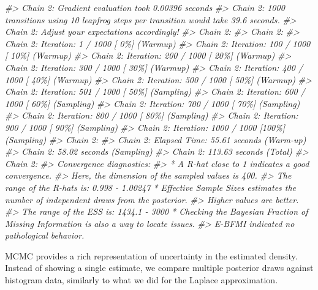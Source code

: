 \documentclass[
]{article}
\newenvironment{Shaded}{\begin{snugshade}}{\end{snugshade}}
\newcommand{\CommentTok}[1]{\textcolor[rgb]{0.56,0.35,0.01}{\textit{#1}}}
\begin{document}
\begin{Shaded}
\begin{Highlighting}[]
\CommentTok{\#\textgreater{} Chain 2: Gradient evaluation took 0.00396 seconds}
\CommentTok{\#\textgreater{} Chain 2: 1000 transitions using 10 leapfrog steps per transition would take 39.6 seconds.}
\CommentTok{\#\textgreater{} Chain 2: Adjust your expectations accordingly!}
\CommentTok{\#\textgreater{} Chain 2: }
\CommentTok{\#\textgreater{} Chain 2: }
\CommentTok{\#\textgreater{} Chain 2: Iteration:   1 / 1000 [  0\%]  (Warmup)}
\CommentTok{\#\textgreater{} Chain 2: Iteration: 100 / 1000 [ 10\%]  (Warmup)}
\CommentTok{\#\textgreater{} Chain 2: Iteration: 200 / 1000 [ 20\%]  (Warmup)}
\CommentTok{\#\textgreater{} Chain 2: Iteration: 300 / 1000 [ 30\%]  (Warmup)}
\CommentTok{\#\textgreater{} Chain 2: Iteration: 400 / 1000 [ 40\%]  (Warmup)}
\CommentTok{\#\textgreater{} Chain 2: Iteration: 500 / 1000 [ 50\%]  (Warmup)}
\CommentTok{\#\textgreater{} Chain 2: Iteration: 501 / 1000 [ 50\%]  (Sampling)}
\CommentTok{\#\textgreater{} Chain 2: Iteration: 600 / 1000 [ 60\%]  (Sampling)}
\CommentTok{\#\textgreater{} Chain 2: Iteration: 700 / 1000 [ 70\%]  (Sampling)}
\CommentTok{\#\textgreater{} Chain 2: Iteration: 800 / 1000 [ 80\%]  (Sampling)}
\CommentTok{\#\textgreater{} Chain 2: Iteration: 900 / 1000 [ 90\%]  (Sampling)}
\CommentTok{\#\textgreater{} Chain 2: Iteration: 1000 / 1000 [100\%]  (Sampling)}
\CommentTok{\#\textgreater{} Chain 2: }
\CommentTok{\#\textgreater{} Chain 2:  Elapsed Time: 55.61 seconds (Warm{-}up)}
\CommentTok{\#\textgreater{} Chain 2:                58.02 seconds (Sampling)}
\CommentTok{\#\textgreater{} Chain 2:                113.63 seconds (Total)}
\CommentTok{\#\textgreater{} Chain 2: }
\CommentTok{\#\textgreater{} Convergence diagnostics:}
\CommentTok{\#\textgreater{}   * A R{-}hat close to 1 indicates a good convergence.}
\CommentTok{\#\textgreater{} Here, the dimension of the sampled values is 400.}
\CommentTok{\#\textgreater{} The range of the R{-}hats is: 0.998 {-} 1.00247  * Effective Sample Sizes estimates the number of independent draws from the posterior.}
\CommentTok{\#\textgreater{} Higher values are better.}
\CommentTok{\#\textgreater{} The range of the ESS is: 1434.1 {-} 3000  * Checking the Bayesian Fraction of Missing Information is also a way to locate issues.}
\CommentTok{\#\textgreater{} E{-}BFMI indicated no pathological behavior.}
\end{Highlighting}
\end{Shaded}

MCMC provides a rich representation of uncertainty in the estimated density. Instead of showing a single estimate, we compare multiple posterior draws against histogram data, similarly to what we did for the Laplace approximation.
\end{document}
